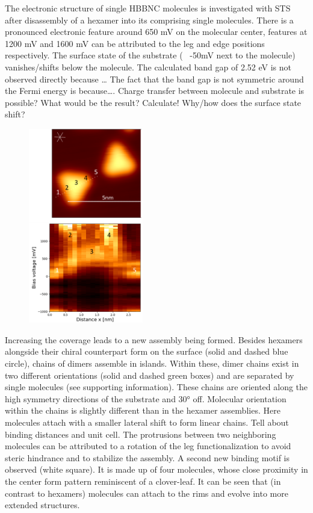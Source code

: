The electronic structure of single HBBNC molecules is investigated with STS after disassembly of a hexamer into its comprising single molecules. There is a pronounced electronic feature around 650 mV on the molecular center, features at 1200 mV and 1600 mV can be attributed to the leg and edge positions respectively. The surface state of the substrate (~ -50mV next to the molecule) vanishes/shifts below the molecule. The calculated band gap of 2.52 eV is not observed directly because …
The fact that the band gap is not symmetric around the Fermi energy is because….
Charge transfer between molecule and substrate is possible? What would be the result? Calculate!
Why/how does the surface state shift?


\begin{figure}\centering
	\includegraphics[width=5cm]{./images/hbbnc-ag-111-rt-linespectrum}
	\caption{}
	\label{}
\end{figure}

Increasing the coverage leads to a new assembly being formed. Besides hexamers alongside their chiral counterpart form on the surface (solid and dashed blue circle), chains of dimers assemble in islands. Within these, dimer chains exist in two different orientations (solid and dashed green boxes) and are separated by single molecules (see supporting information). 
These chains are oriented along the high symmetry directions of the substrate and 30° off. Molecular orientation within the chains is slightly different than in the hexamer assemblies. Here molecules attach with a smaller lateral shift to form linear chains. 
Tell about
binding distances and unit cell.
The protrusions between two neighboring molecules can be attributed to a rotation of the leg functionalization to avoid steric hindrance and to stabilize the assembly.
A second new binding motif is observed (white square).  It is made up of four molecules, whose close proximity in the center form pattern reminiscent of a clover-leaf. It can be seen that (in contrast to hexamers) molecules can attach to the rims and evolve into more extended structures.


